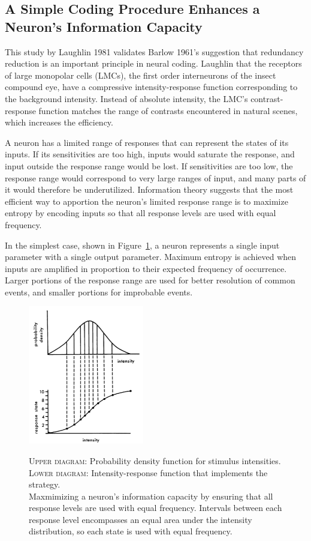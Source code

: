 \documentclass[twoside]{article}
\begin{document}
\begin{multicols}{2}
\section{A Simple Coding Procedure Enhances a Neuron's Information Capacity}

This study by Laughlin 1981 validates Barlow 1961's suggestion that redundancy reduction is an important principle in neural coding. Laughlin that the receptors of large monopolar cells (LMCs), the first order interneurons of the insect compound eye, have a compressive intensity-response function corresponding to the background intensity. Instead of absolute intensity, the LMC's contrast-response function matches the range of contrasts encountered in natural scenes, which increases the efficiency.

A neuron has a limited range of responses that can represent the states of its inputs. If its sensitivities are too high, inputs would saturate the response, and input outside the response range would be lost. If sensitivities are too low, the response range would correspond to very large ranges of input, and many parts of it would therefore be underutilized. Information theory suggests that the most efficient way to apportion the neuron's limited response range is to maximize entropy by encoding inputs so that all response levels are used with equal frequency. 

In the simplest case, shown in Figure~\ref{fig:laughlin1981-fig1}, a neuron represents a single input parameter with a single output parameter. Maximum entropy is achieved when inputs are amplified in proportion to their expected frequency of occurrence. Larger portions of the response range are used for better resolution of common events, and smaller portions for improbable events. 

\begin{figure}[H]
	\caption{
		\textsc{Upper diagram:} Probability density function for stimulus intensities. \\ \textsc{Lower diagram:} Intensity-response function that implements the strategy. \\ Maxmimizing a neuron's information capacity by ensuring that all response levels are used with equal frequency. Intervals between each response level encompasses an equal area under the intensity distribution, so each state is used with equal frequency.
	}
	\includegraphics[width=0.45\textwidth]{laughlin1981-fig1}
	\label{fig:laughlin1981-fig1}
\end{figure}


\end{multicols}
\end{document}
